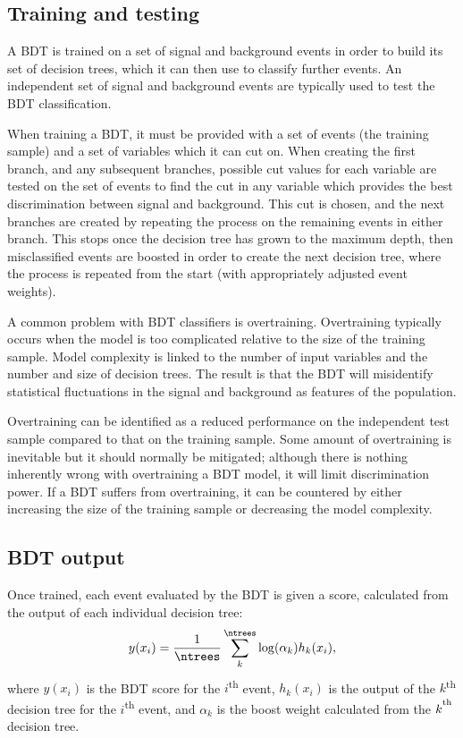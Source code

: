 \subsection{Training and testing}

A \ac{BDT} is trained on a set of signal and background events in order to build
its set of decision trees, which it can then use to classify further events.
An independent set of signal and background events are typically used to test
the \ac{BDT} classification.

When training a \ac{BDT}, it must be provided with a set of events (the training
sample) and a set of variables which it can cut on. When creating the first
branch, and any subsequent branches, possible cut values for each variable are
tested on the set of events to find the cut in any variable which provides the
best discrimination between signal and background. This cut is chosen, and the
next branches are created by repeating the process on the remaining events in
either branch. This stops once the decision tree has grown to the maximum depth,
then misclassified events are boosted in order to create the next decision tree,
where the process is repeated from the start (with appropriately adjusted event weights).

A common problem with \ac{BDT} classifiers is overtraining. Overtraining
typically occurs when the model is too complicated relative to the size of the
training sample. Model complexity is linked to the number of input variables and
the number and size of decision trees.
The result is that the \ac{BDT} will misidentify statistical fluctuations
in the signal and background as features of the population.

Overtraining can be identified as a reduced performance on the independent
test sample compared to that on the training sample. Some amount of overtraining is
inevitable but it should normally be mitigated; although there is nothing
inherently wrong with overtraining a \ac{BDT} model, it will limit
discrimination power. If a \ac{BDT} suffers from overtraining, it can be
countered by either increasing the size of the training sample or decreasing the
model complexity.

\subsection{BDT output}
\label{sec:methods-bdt-output}

Once trained, each event evaluated by the \ac{BDT} is given a score,
calculated from the output of each individual decision tree:
\begin{equation*}
  y(x_i) = \frac1{\ntrees} \sum_k^{\ntrees} \log(\alpha_k)h_k(x_i),
\end{equation*}
where $y(x_i)$ is the \ac{BDT} score for the $i$\textsuperscript{th} event,
$h_k(x_i)$ is the output of the $k$\textsuperscript{th} decision tree for the
$i$\textsuperscript{th} event, and $\alpha_k$ is the boost weight calculated
from the $k^\textsuperscript{th}$ decision tree.

